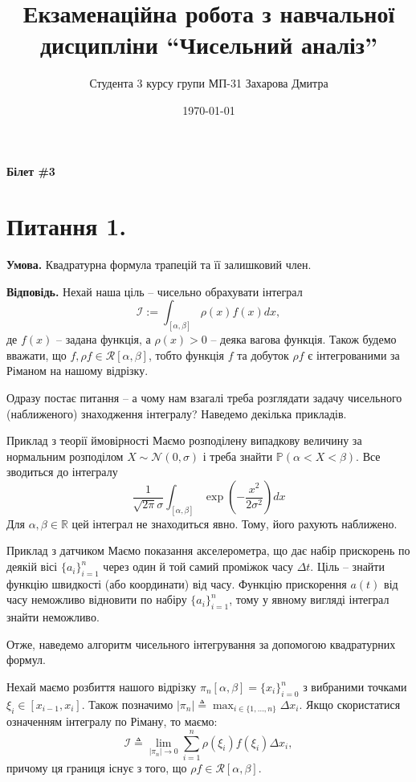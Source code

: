 \documentclass[14pt]{extarticle}
\title{Екзаменаційна робота з навчальної дисципліни ``Чисельний аналіз''}
\author{Студента 3 курсу групи МП-31 Захарова Дмитра}
\date{\today}
\begin{document}
\maketitle

\begin{center}
    \textbf{Білет \#3}
\end{center}
\section*{Питання 1.}

\textbf{Умова.} Квадратурна формула трапецій та її залишковий член.

\textbf{Відповідь.} Нехай наша ціль -- чисельно обрахувати інтеграл
\begin{equation}\label{eq:int}
\mathcal{I} := \int_{[\alpha,\beta]} \rho(x)f(x)dx,
\end{equation}
де $f(x)$ -- задана функція, а $\rho(x) > 0$ -- деяка вагова функція. Також будемо вважати, що $f,\rho f \in \mathcal{R}[\alpha,\beta]$, тобто функція $f$ та добуток $\rho f$ є інтегрованими за Ріманом на нашому відрізку. 

Одразу постає питання -- а чому нам взагалі треба розглядати задачу чисельного (наближеного) знаходження інтегралу? Наведемо декілька прикладів.

\begin{example*}{Приклад з теорії ймовірності}
Маємо розподілену випадкову величину за нормальним розподілом $X \sim \mathcal{N}(0,\sigma)$ і треба знайти $\mathbb{P}(\alpha < X < \beta)$. Все зводиться до інтегралу
\[
\frac{1}{\sqrt{2\pi}\sigma}\int_{[\alpha,\beta]}\exp\left(-\frac{x^2}{2\sigma^2}\right)dx
\]
Для $\alpha,\beta \in \mathbb{R}$ цей інтеграл не знаходиться явно. Тому, його рахують наближено. 
\end{example*}

\begin{example*}{Приклад з датчиком}
Маємо показання акселерометра, що дає набір прискорень по деякій вісі $\{a_i\}_{i=1}^n$ через один й той самий проміжок часу $\Delta t$. Ціль -- знайти функцію швидкості (або координати) від часу. Функцію прискорення $a(t)$ від часу неможливо відновити по набіру $\{a_i\}_{i=1}^n$, тому у явному вигляді інтеграл знайти неможливо.
\end{example*}

Отже, наведемо алгоритм чисельного інтегрування за допомогою квадратурних формул.

Нехай маємо розбиття нашого відрізку $\pi_n[\alpha,\beta]=\{x_i\}_{i=0}^n$ з вибраними точками $\xi_i \in [x_{i-1},x_i]$. Також позначимо $|\pi_n| \triangleq \max_{i \in \{1,\dots,n\}} \Delta x_i$. Якщо скористатися означенням інтегралу по Ріману, то маємо:
\begin{equation}
\mathcal{I} \triangleq \lim_{|\pi_n| \to 0} \sum_{i=1}^n \rho(\xi_i)f(\xi_i)\Delta x_i,
\end{equation}
причому ця границя існує з того, що $\rho f \in \mathcal{R}[\alpha,\beta]$. 
\end{document}

